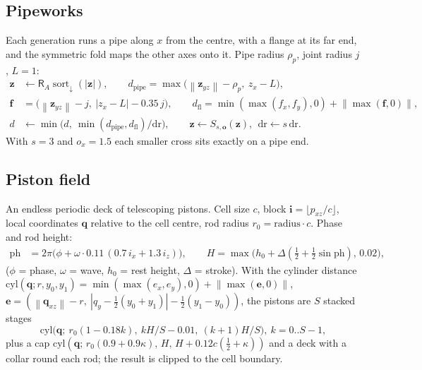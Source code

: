 \documentclass[10pt,a4paper]{article}
\newcommand{\vv}[1]{\mathbf{#1}}
\newcommand{\abs}[1]{\left|#1\right|}
\newcommand{\norm}[1]{\left\lVert#1\right\rVert}
\newcommand{\sortd}{\operatorname{sort}_{\downarrow}}
\newcommand{\Rot}{\mathsf{R}}
\begin{document}
\subsection{Pipeworks}
Each generation runs a pipe along $x$ from the centre, with a flange at its far end, and the symmetric fold maps the other axes onto it. Pipe radius $\rho_p$, joint radius $j$, $L=1$:
\begin{align}
\vv z&\leftarrow\Rot_A\sortd(\abs{\vv z}),\qquad d_{\text{pipe}}=\max\!\big(\norm{\vv z_{yz}}-\rho_p,\ z_x-L\big),\\
\vv f&=\big(\norm{\vv z_{yz}}-j,\ \abs{z_x-L}-0.35\,j\big),\qquad d_{\text{fl}}=\min(\max(f_x,f_y),0)+\norm{\max(\vv f,0)},\\
d&\leftarrow\min\!\big(d,\ \min(d_{\text{pipe}},d_{\text{fl}})/\mathrm{dr}\big),\qquad\vv z\leftarrow S_{s,\vv o}(\vv z),\ \ \mathrm{dr}\leftarrow s\,\mathrm{dr}.
\end{align}
With $s=3$ and $o_x=1.5$ each smaller cross sits exactly on a pipe end.


\subsection{Piston field}
An endless periodic deck of telescoping pistons. Cell size $c$, block $\vv i=\lfloor p_{xz}/c\rfloor$, local coordinates $\vv q$ relative to the cell centre, rod radius $r_0=\text{radius}\cdot c$. Phase and rod height:
\begin{align}
\mathrm{ph}&=2\pi\big(\phi+\omega\cdot0.11\,(0.7\,i_x+1.3\,i_z)\big),\qquad H=\max\!\big(h_0+\Delta(\tfrac12+\tfrac12\sin\mathrm{ph}),\,0.02\big),
\end{align}
($\phi$ = phase, $\omega$ = wave, $h_0$ = rest height, $\Delta$ = stroke). With the cylinder distance
$\mathrm{cyl}(\vv q;r,y_0,y_1)=\min(\max(e_x,e_y),0)+\norm{\max(\vv e,0)}$, $\vv e=(\norm{\vv q_{xz}}-r,\ \abs{q_y-\tfrac12(y_0+y_1)}-\tfrac12(y_1-y_0))$, the pistons are $S$ stacked stages
\begin{equation}
\mathrm{cyl}\big(\vv q;\ r_0(1-0.18k),\ kH/S-0.01,\ (k+1)H/S\big),\ k=0..S-1,
\end{equation}
plus a cap $\mathrm{cyl}(\vv q;\,r_0(0.9+0.9\kappa),\,H,\,H+0.12c(\tfrac12+\kappa))$ and a deck with a collar round each rod; the result is clipped to the cell boundary.

\end{document}
